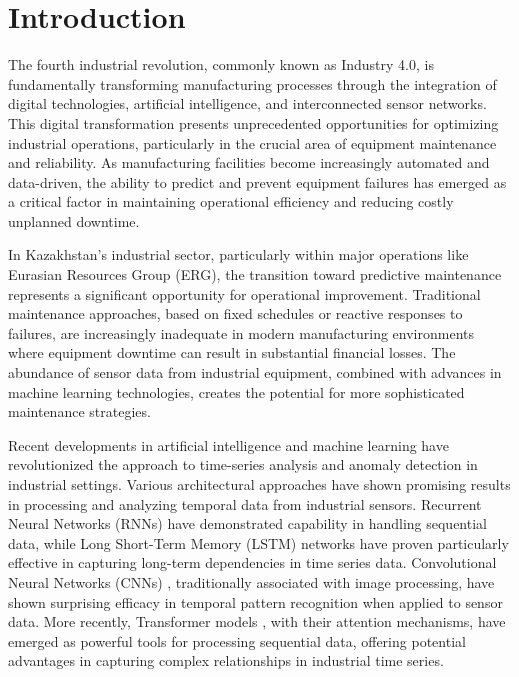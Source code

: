 \chapter{Introduction}
\label{chap:introduction}
\setlength{\parskip}{1em}

The fourth industrial revolution, commonly known as Industry 4.0, is fundamentally transforming manufacturing processes through the integration of digital technologies, artificial intelligence, and interconnected sensor networks. This digital transformation presents unprecedented opportunities for optimizing industrial operations, particularly in the crucial area of equipment maintenance and reliability. As manufacturing facilities become increasingly automated and data-driven, the ability to predict and prevent equipment failures has emerged as a critical factor in maintaining operational efficiency and reducing costly unplanned downtime.

In Kazakhstan's industrial sector, particularly within major operations like Eurasian Resources Group (ERG), the transition toward predictive maintenance represents a significant opportunity for operational improvement. Traditional maintenance approaches, based on fixed schedules or reactive responses to failures, are increasingly inadequate in modern manufacturing environments where equipment downtime can result in substantial financial losses. The abundance of sensor data from industrial equipment, combined with advances in machine learning technologies, creates the potential for more sophisticated maintenance strategies.

Recent developments in artificial intelligence and machine learning have revolutionized the approach to time-series analysis and anomaly detection in industrial settings. Various architectural approaches have shown promising results in processing and analyzing temporal data from industrial sensors. Recurrent Neural Networks (RNNs) \cite{waqas-2024-critical} have demonstrated capability in handling sequential data, while Long Short-Term Memory (LSTM) \cite{van-houdt-2020} networks have proven particularly effective in capturing long-term dependencies in time series data. Convolutional Neural Networks (CNNs) \cite{oshea-2015}, traditionally associated with image processing, have shown surprising efficacy in temporal pattern recognition when applied to sensor data. More recently, Transformer models \cite{ashish2017attention}, with their attention mechanisms, have emerged as powerful tools for processing sequential data, offering potential advantages in capturing complex relationships in industrial time series.

